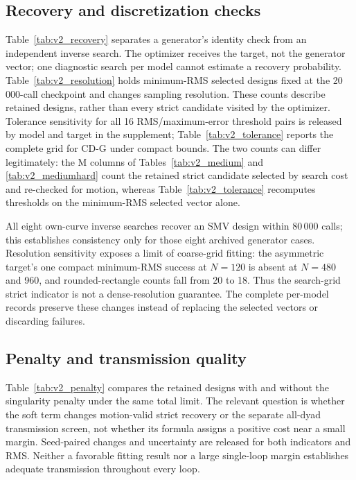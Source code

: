 \documentclass[applsci,article,submit,pdftex,moreauthors]{Definitions/mdpi}
\begin{document}
\subsection{Recovery and discretization checks}
Table~\ref{tab:v2_recovery} separates a generator's identity check from an independent inverse search. The optimizer receives the target, not the generator vector; one diagnostic search per model cannot estimate a recovery probability. Table~\ref{tab:v2_resolution} holds minimum-RMS selected designs fixed at the 20\,000-call checkpoint and changes sampling resolution. These counts describe retained designs, rather than every strict candidate visited by the optimizer. Tolerance sensitivity for all 16 RMS/maximum-error threshold pairs is released by model and target in the supplement; Table~\ref{tab:v2_tolerance} reports the complete grid for CD-G under compact bounds. The two counts can differ legitimately: the M columns of Tables~\ref{tab:v2_medium} and \ref{tab:v2_mediumhard} count the retained strict candidate selected by search cost and re-checked for motion, whereas Table~\ref{tab:v2_tolerance} recomputes thresholds on the minimum-RMS selected vector alone.



All eight own-curve inverse searches recover an SMV design within 80\,000 calls; this establishes consistency only for those eight archived generator cases. Resolution sensitivity exposes a limit of coarse-grid fitting: the asymmetric target's one compact minimum-RMS success at $N=120$ is absent at $N=480$ and 960, and rounded-rectangle counts fall from 20 to 18. Thus the search-grid strict indicator is not a dense-resolution guarantee. The complete per-model records preserve these changes instead of replacing the selected vectors or discarding failures.

\subsection{Penalty and transmission quality}\label{sec:penalty_results}
Table~\ref{tab:v2_penalty} compares the retained designs with and without the singularity penalty under the same total limit. The relevant question is whether the soft term changes motion-valid strict recovery or the separate all-dyad transmission screen, not whether its formula assigns a positive cost near a small margin. Seed-paired changes and uncertainty are released for both indicators and RMS. Neither a favorable fitting result nor a large single-loop margin establishes adequate transmission throughout every loop.
\end{document}

